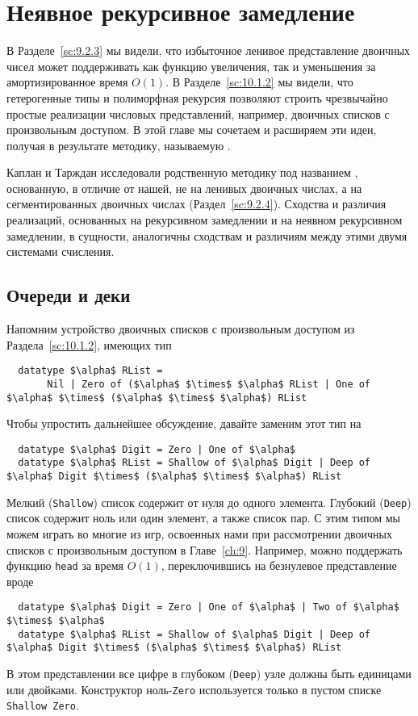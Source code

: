 \chapter{Неявное рекурсивное замедление}
\label{ch:11}

В Разделе~\ref{sc:9.2.3} мы видели, что избыточное ленивое
представление двоичных чисел может поддерживать как функцию
увеличения, так и уменьшения за амортизированное время $O(1)$. В
Разделе~\ref{sc:10.1.2} мы видели, что гетерогенные типы и полиморфная
рекурсия позволяют строить чрезвычайно простые реализации числовых
представлений, например, двоичных списков с произвольным доступом. В
этой главе мы сочетаем и расширяем эти идеи, получая в результате
методику, называемую .

Каплан и Тарждан \cite{KaplanTarjan1995, KaplanTarjan1996b,
  KaplanTarjan1996a} исследовали родственную методику под названием
, основанную, в
отличие от нашей, не на ленивых двоичных числах, а на сегментированных
двоичных числах (Раздел~\ref{sc:9.2.4}). Сходства и различия
реализаций, основанных на рекурсивном замедлении и на неявном
рекурсивном замедлении, в сущности, аналогичны сходствам и различиям
между этими двумя системами счисления.

\section{Очереди и деки}
\label{sc:11.1}

Напомним устройство двоичных списков с произвольным доступом из
Раздела~\ref{sc:10.1.2}, имеющих тип
\begin{lstlisting}
  datatype $\alpha$ RList =
       Nil | Zero of ($\alpha$ $\times$ $\alpha$ RList | One of $\alpha$ $\times$ ($\alpha$ $\times$ $\alpha$) RList
\end{lstlisting}
Чтобы упростить дальнейшее обсуждение, давайте заменим этот тип на
\begin{lstlisting}
  datatype $\alpha$ Digit = Zero | One of $\alpha$
  datatype $\alpha$ RList = Shallow of $\alpha$ Digit | Deep of $\alpha$ Digit $\times$ ($\alpha$ $\times$ $\alpha$) RList
\end{lstlisting}
Мелкий (\lstinline!Shallow!) список содержит от нуля до одного
элемента. Глубокий (\lstinline!Deep!) список содержит ноль или один
элемент, а также список пар. С этим типом мы можем играть во многие из
игр, освоенных нами при рассмотрении двоичных списков с произвольным
доступом в Главе~\ref{ch:9}. Например, можно поддержать функцию
\lstinline!head! за время $O(1)$, переключившись на безнулевое
представление вроде
\begin{lstlisting}
  datatype $\alpha$ Digit = Zero | One of $\alpha$ | Two of $\alpha$ $\times$ $\alpha$
  datatype $\alpha$ RList = Shallow of $\alpha$ Digit | Deep of $\alpha$ Digit $\times$ ($\alpha$ $\times$ $\alpha$) RList
\end{lstlisting}
В этом представлении все цифре в глубоком (\lstinline!Deep!) узле
должны быть единицами или двойками. Конструктор ноль-\lstinline!Zero!
используется только в пустом списке \lstinline!Shallow Zero!.


